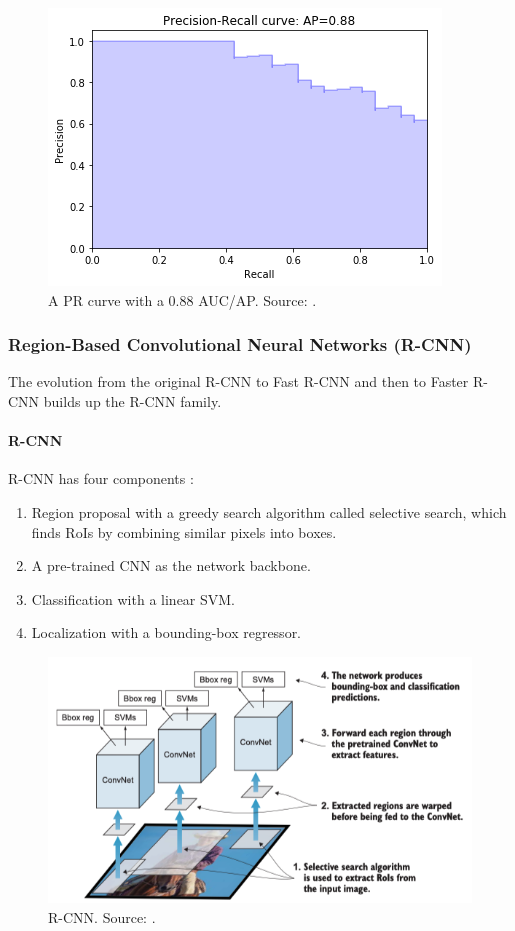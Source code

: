 \documentclass[a4paper, 11pt, oneside]{article}
\begin{document}
\begin{figure}[ht]
  \begin{center}
    \includegraphics[width=.5\textwidth]{pr_curve.png}
  \end{center}
  \caption{A PR curve with a 0.88 AUC/AP. Source: \cite{planche2019hands}.}
\end{figure}

\subsubsection{Region-Based Convolutional Neural Networks (R-CNN)}

The evolution from the original R-CNN \cite{girshick2014rich} to Fast R-CNN \cite{girshick2015fast} and then to
Faster R-CNN \cite{ren2015faster} builds up the R-CNN family.

\paragraph{R-CNN}

R-CNN has four components \cite{elgendy2020deep, girshick2014rich}:

\begin{enumerate}
  \item Region proposal with a greedy search algorithm called selective search, which finds RoIs by combining similar
  pixels into boxes.
  \item A pre-trained CNN as the network backbone.
  \item Classification with a linear SVM.
  \item Localization with a bounding-box regressor.
\end{enumerate}

\begin{figure}[ht]
  \begin{center}
    \includegraphics[width=.8\textwidth]{r_cnn.png}
  \end{center}
  \caption{R-CNN. Source: \cite{elgendy2020deep}.}
\end{figure}
\end{document}
